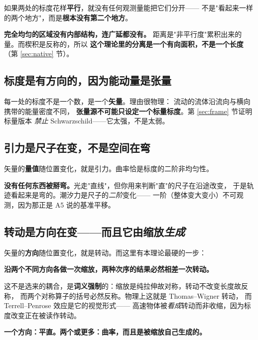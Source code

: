 \documentclass[11pt,a4paper]{article}
\theoremstyle{sudef}
\begin{document}
如果两处的标度花样\textbf{平行}，就没有任何观测量能把它们分开——
不是"看起来一样的两个地方"，而是\textbf{根本没有第二个地方}。

\textbf{完全均匀的区域没有内部结构，连广延都没有。}
距离是"非平行度"累积出来的量。而楔积是反称的，所以
\textbf{这个理论里的分离是一个有向面积，不是一个长度}（第 \ref{sec:native} 节）。

\subsection{标度是有方向的，因为能动量是张量}

每一处的标度不是一个数，是一个\textbf{矢量}。理由很物理：
流动的流体沿流向与横向携带的能量密度不同，
\textbf{张量源不可能只设定一个标量标度}。第 \ref{sec:frame} 节证明标量版本
\emph{禁止} Schwarzschild——它太强，不是太弱。

\subsection{引力是尺子在变，不是空间在弯}

矢量的\textbf{量值}随位置变化，就是引力。曲率恰是标度的二阶非均匀性。

\begin{mdframed}[linecolor=axcol,linewidth=1pt,backgroundcolor=axcol!5]
\textbf{没有任何东西被掰弯。}光走"直线"，但你用来判断"直"的尺子在沿途改变，
于是轨迹看起来是弯的。潮汐力是尺子的\emph{二阶}变化——
一阶（整体变大变小）不可观测，因为那正是 A5 说的基准平移。
\end{mdframed}

\subsection{转动是方向在变——而且它由缩放\emph{生成}}

矢量的\textbf{方向}随位置变化，就是转动。而这里有本理论最硬的一步：

\begin{center}
\textbf{沿两个不同方向各做一次缩放，两种次序的结果必然相差一次转动。}
\end{center}

这不是选来的耦合，是\textbf{词义强制}的：缩放是纯拉伸故对称，转动不改变长度故反称，
而两个对称算子的括号必然反称。物理上这就是 Thomas--Wigner 转动，
而 Terrell--Penrose 效应是它的视觉形式——
高速物体被\emph{看成}转动而非收缩，因为标度改变正在被读作转动。

\textbf{一个方向：平直。两个或更多：曲率，而且是被缩放自己生成的。}
\end{document}
